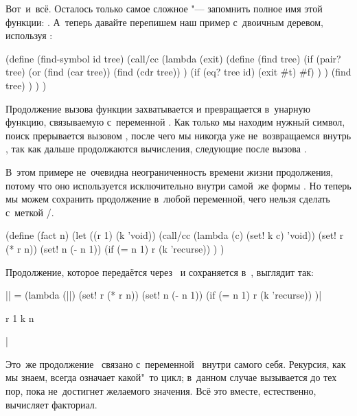 Вот~и~всё. Осталось только самое сложное "--- запомнить полное имя этой функции:
. А~теперь давайте перепишем наш пример
с~двоичным деревом, используя :

\begin{code:lisp}
(define (find-symbol id tree)
  (call/cc
   (lambda (exit)
     (define (find tree)
       (if (pair? tree)
           (or (find (car tree))
               (find (cdr tree)) )
           (if (eq? tree id) (exit #t) #f) ) )
     (find tree) ) ) )
\end{code:lisp}

Продолжение вызова функции  захватывается и превращается
в~унарную функцию, связываемую с~переменной . Как только мы находим
нужный символ, поиск прерывается вызовом , после чего мы никогда уже
не~возвращаемся внутрь , так как дальше продолжаются вычисления,
следующие после вызова .

В~этом примере не~очевидна неограниченность времени жизни продолжения, потому
что оно используется исключительно внутри самой~же формы . Но теперь
мы можем сохранить продолжение в~любой переменной, чего нельзя сделать с~меткой
/.

\begin{code:lisp}
(define (fact n)
  (let ((r 1) (k 'void))
    (call/cc (lambda (c) (set! k c) 'void))
    (set! r (* r n))
    (set! n (- n 1))
    (if (= n 1) r (k 'recurse)) ) )
\end{code:lisp}

\noindent
Продолжение, которое передаётся через~ и сохраняется в~, выглядит
так:

\begin{code:lisp}
|| = (lambda (||)
      (set! r (* r n))
      (set! n (- n 1))
      (if (= n 1) r (k 'recurse)) )|\begin{where}
                                    \- r {\is} 1
                                    \- k {\is} 
                                    \- n
                                    \end{where}|
\end{code:lisp}

Это~же продолжение~ связано с~переменной~ внутри самого себя.
Рекурсия, как мы знаем, всегда означает какой"~то цикл; в~данном случае 
вызывается до тех пор, пока  не~достигнет желаемого значения. Всё это
вместе, естественно, вычисляет факториал.

